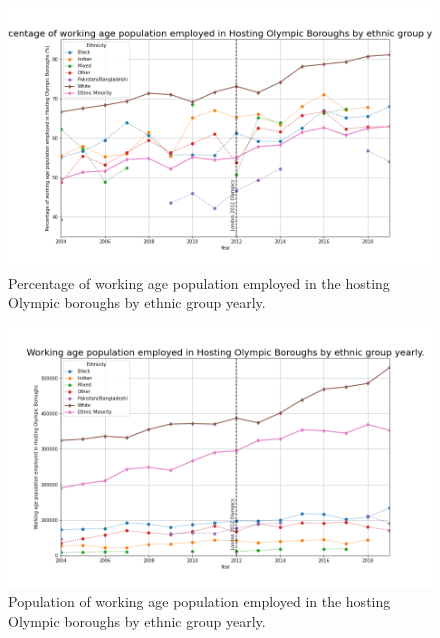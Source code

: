 \documentclass[12pt,twoside]{article}
\begin{document}
\begin{figure}[!htb]
\centering
\includegraphics[width=0.9\linewidth]{figures/percentages-Hosting Olympic Boroughs.png}
\caption{Percentage of working age population employed in the hosting Olympic boroughs by ethnic group yearly.}
\label{fig:perc-hosting}
\end{figure}
\begin{figure}[!htb]
\centering
\includegraphics[width=0.9\linewidth]{figures/population-Hosting Olympic Boroughs.png}
\caption{Population of working age population employed in the hosting Olympic boroughs by ethnic group yearly.}
\label{fig:pop-hosting}
\end{figure}
\end{document}

